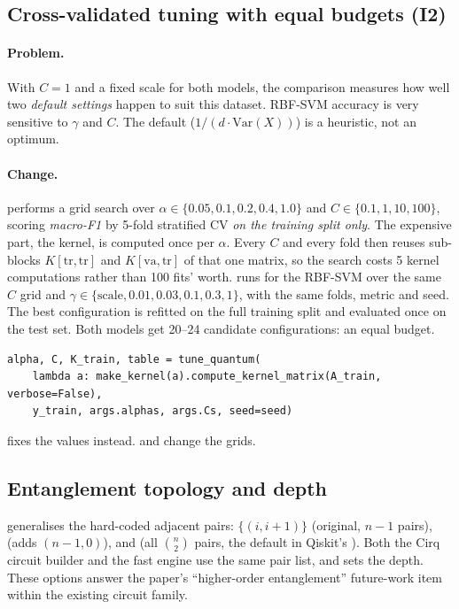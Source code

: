 \subsection{Cross-validated tuning with equal budgets (I2)}
\paragraph{Problem.} With $C=1$ and a fixed scale for both models, the comparison measures how
well two \emph{default settings} happen to suit this dataset. RBF-SVM accuracy is very sensitive to
$\gamma$ and $C$. The default  ($1/(d\cdot\mathrm{Var}(X))$) is a heuristic, not
an optimum.

\paragraph{Change.}  performs a grid search over
$\alpha\in\{0.05,0.1,0.2,0.4,1.0\}$ and $C\in\{0.1,1,10,100\}$, scoring \emph{macro-F1} by 5-fold
stratified CV \emph{on the training split only}. The expensive part, the kernel, is computed once
per $\alpha$. Every $C$ and every fold then reuses sub-blocks $K[\text{tr},\text{tr}]$ and
$K[\text{va},\text{tr}]$ of that one matrix, so the search costs 5 kernel computations rather than
100 fits' worth.  runs  for the RBF-SVM over the same
$C$ grid and $\gamma\in\{\text{scale},0.01,0.03,0.1,0.3,1\}$, with the same folds, metric and seed.
The best configuration is refitted on the full training split and evaluated once on the test set.
Both models get 20--24 candidate configurations: an equal budget.

\begin{verbatim}
alpha, C, K_train, table = tune_quantum(
    lambda a: make_kernel(a).compute_kernel_matrix(A_train, verbose=False),
    y_train, args.alphas, args.Cs, seed=seed)
\end{verbatim}

 fixes the values instead.  and  change
the grids.

\subsection{Entanglement topology and depth}
 generalises the hard-coded adjacent pairs:
 $\{(i,i{+}1)\}$ (original, $n-1$ pairs),  (adds $(n{-}1,0)$), and
 (all $\binom n2$ pairs, the default in Qiskit's ). Both the Cirq
circuit builder and the fast engine use the same pair list, and  sets the depth. These
options answer the paper's ``higher-order entanglement'' future-work item within the existing
circuit family.

